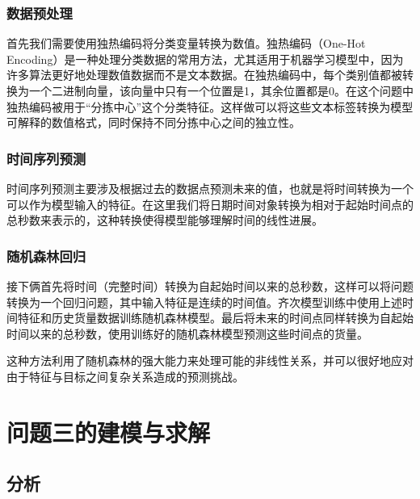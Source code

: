 \documentclass[UTF8,a4paper,10 pt]{article}%
\begin{document}
\subsubsection{数据预处理}
首先我们需要使用独热编码将分类变量转换为数值。独热编码（One-Hot Encoding）是一种处理分类数据的常用方法，尤其适用于机器学习模型中，因为许多算法更好地处理数值数据而不是文本数据。在独热编码中，每个类别值都被转换为一个二进制向量，该向量中只有一个位置是1，其余位置都是0。在这个问题中独热编码被用于“分拣中心”这个分类特征。这样做可以将这些文本标签转换为模型可解释的数值格式，同时保持不同分拣中心之间的独立性。

\subsubsection{时间序列预测}

时间序列预测主要涉及根据过去的数据点预测未来的值，也就是将时间转换为一个可以作为模型输入的特征。在这里我们将日期时间对象转换为相对于起始时间点的总秒数来表示的，这种转换使得模型能够理解时间的线性进展。

\subsubsection{随机森林回归}
接下俩首先将时间（完整时间）转换为自起始时间以来的总秒数，这样可以将问题转换为一个回归问题，其中输入特征是连续的时间值。齐次模型训练中使用上述时间特征和历史货量数据训练随机森林模型。最后将未来的时间点同样转换为自起始时间以来的总秒数，使用训练好的随机森林模型预测这些时间点的货量。

这种方法利用了随机森林的强大能力来处理可能的非线性关系，并可以很好地应对由于特征与目标之间复杂关系造成的预测挑战。


\section{问题三的建模与求解}

\subsection{分析}
\end{document}
